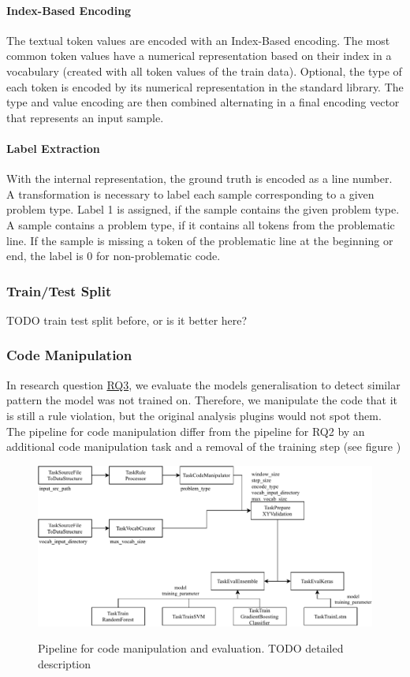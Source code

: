 \paragraph{Index-Based Encoding}
The textual token values are encoded with an Index-Based encoding. The most common token values have a numerical representation based on their index in a vocabulary (created with all token values of the train data). Optional, the type of each token is encoded by its numerical representation in the standard library. The type and value encoding are then combined alternating in a final encoding vector that represents an input sample.
\paragraph{Label Extraction}
With the internal representation, the ground truth is encoded as a line number. A transformation is necessary to label each sample corresponding to a given problem type. Label 1 is assigned, if the sample contains the given problem type. A sample contains a problem type, if it contains all tokens from the problematic line. If the sample is missing a token of the problematic line at the beginning or end, the label is 0 for non-problematic code. 

\subsubsection{Train/Test Split}
TODO train test split before, or is it better here?


\subsubsection{Code Manipulation}\label{sec:approach_code_manipulation}
In research question \hyperref[rq:3]{RQ3}, we evaluate the models generalisation to detect similar pattern the model was not trained on. Therefore, we manipulate the code that it is still a rule violation, but the original analysis plugins would not spot them. The pipeline for code manipulation differ from the pipeline for RQ2 by an additional code manipulation task and a removal of the training step (see figure )

\begin{figure}
    \includegraphics[width=1\textwidth]{img/ML/Pipeline_RQ3.pdf}
    \label{fig:pipeline_RQ3}
    \caption{Pipeline for code manipulation and evaluation. TODO detailed description}
\end{figure}


